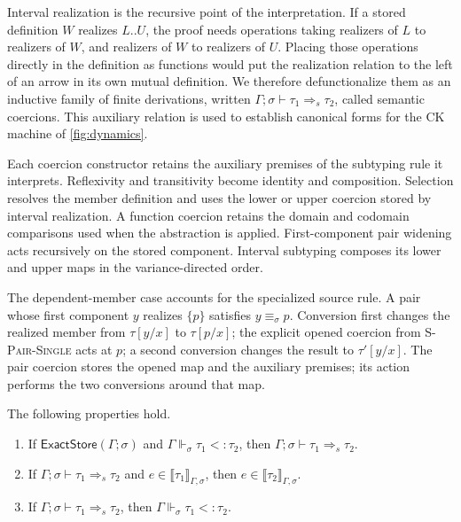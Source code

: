 \documentclass[acmsmall,screen,nonacm]{acmart}
\newcommand{\sing}[1]{\{#1\}}
\newcommand{\subst}[3]{#1[#2/#3]}
\newcommand{\semmap}{\mathrel{\Rightarrow_{\!s}}}
\newcommand{\runtimeeq}{\mathrel{\equiv_{\sigma}}}
\newcommand{\struct}{\Vdash}
\newcommand{\storeexact}{\mathsf{ExactStore}}
\begin{document}
Interval realization is the recursive point of the interpretation. If a
stored definition \(W\) realizes \(L..U\), the proof needs operations taking
realizers of \(L\) to realizers of \(W\), and realizers of \(W\) to realizers
of \(U\). Placing those operations directly in the definition as functions
would put the realization relation to the left of an arrow in its own mutual
definition. We therefore defunctionalize them as an inductive family of finite
derivations, written
\(\Gamma;\sigma\vdash\tau_1\semmap\tau_2\), called semantic coercions. This
auxiliary relation is used to establish canonical forms for the CK machine of
\cref{fig:dynamics}.

Each coercion constructor retains the auxiliary premises of the subtyping
rule it interprets. Reflexivity and transitivity become identity and
composition. Selection resolves the member definition and uses the lower or
upper coercion stored by interval realization. A function coercion retains
the domain and codomain comparisons used when the abstraction is applied.
First-component pair widening acts recursively on the stored component.
Interval subtyping composes its lower and upper maps in the variance-directed
order.

The dependent-member case accounts for the specialized source rule. A pair
whose first component \(y\) realizes \(\sing{p}\) satisfies
\(y\runtimeeq p\). Conversion first changes the realized member from
\(\subst{\tau}{y}{x}\) to \(\subst{\tau}{p}{x}\); the explicit opened
coercion from \textsc{S-Pair-Single} acts at \(p\); a second conversion changes
the result to \(\subst{\tau'}{y}{x}\). The pair coercion stores the opened map
and the auxiliary premises; its action performs the two conversions around
that map.

\begin{lemma}
\label{lem:coercions}
The following properties hold.
\begin{enumerate}
\item If \(\storeexact(\Gamma;\sigma)\) and
  \(\Gamma\struct_{\sigma}\tau_1<:\tau_2\), then
  \(\Gamma;\sigma\vdash\tau_1\semmap\tau_2\).
\item If \(\Gamma;\sigma\vdash\tau_1\semmap\tau_2\) and
  \(e\in\llbracket\tau_1\rrbracket_{\Gamma,\sigma}\), then
  \(e\in\llbracket\tau_2\rrbracket_{\Gamma,\sigma}\).
\item If \(\Gamma;\sigma\vdash\tau_1\semmap\tau_2\), then
  \(\Gamma\struct_{\sigma}\tau_1<:\tau_2\).
\end{enumerate}
\end{lemma}
\end{document}
